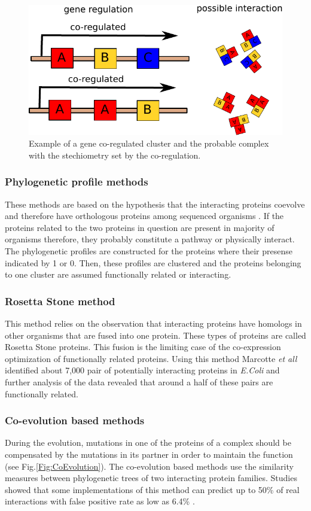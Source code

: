 \begin{figure}[H]
    \begin{centering}
      \includegraphics[width=0.5\linewidth]{Intro/Fig/CoRegulation.pdf}  
      \caption[Co-regulation scheme]{Example of a gene co-regulated cluster and the probable complex with the stechiometry set by the co-regulation.}
      \label{Fig:CoRegulation}
    \end{centering}
\end{figure}

\subsubsection{Phylogenetic profile methods}
These methods are based on the hypothesis that the interacting proteins coevolve and therefore have orthologous proteins among sequenced organisms \cite{barker2005predicting}.
If the proteins related to the two proteins in question are present in majority of organisms therefore, they probably constitute 
a pathway or physically interact. The phylogenetic profiles are constructed for the proteins where their presense indicated by 1 or 0. Then, these
profiles are clustered and the proteins belonging to one cluster are assumed functionally related or interacting.

\subsubsection{Rosetta Stone method}
This method relies on the observation that interacting proteins have homologs in other organisms that are fused into one protein. These types of proteins
are called Rosetta Stone proteins. This fusion is the limiting case of the co-expression optimization of functionally related proteins. Using this method
Marcotte \emph{et all} \cite{marcotte1999detecting} identified about 7,000 pair of potentially interacting proteins in \emph{E.Coli} and further analysis of the data revealed
that around a half of these pairs are functionally related.

\subsubsection{Co-evolution based methods}
During the evolution, mutations in one of the proteins of a complex should be compensated by the mutations in its partner in order to maintain the function (see Fig.\ref{Fig:CoEvolution}). 
The co-evolution based methods use the similarity measures between phylogenetic trees of two interacting protein families. Studies showed that some implementations 
of this method can predict up to 50\% of real interactions with false positive rate as low as 6.4\% \cite{pazos2001similarity}.


